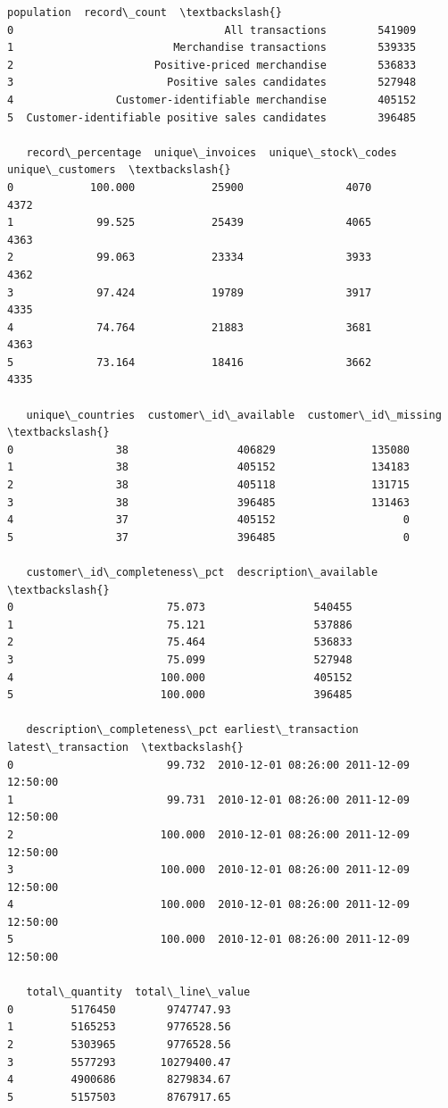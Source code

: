 \documentclass[11pt]{article}
\begin{document}
    
    \begin{Verbatim}[commandchars=\\\{\}]
                                        population  record\_count  \textbackslash{}
0                                 All transactions        541909   
1                         Merchandise transactions        539335   
2                      Positive-priced merchandise        536833   
3                        Positive sales candidates        527948   
4                Customer-identifiable merchandise        405152   
5  Customer-identifiable positive sales candidates        396485   

   record\_percentage  unique\_invoices  unique\_stock\_codes  unique\_customers  \textbackslash{}
0            100.000            25900                4070              4372   
1             99.525            25439                4065              4363   
2             99.063            23334                3933              4362   
3             97.424            19789                3917              4335   
4             74.764            21883                3681              4363   
5             73.164            18416                3662              4335   

   unique\_countries  customer\_id\_available  customer\_id\_missing  \textbackslash{}
0                38                 406829               135080   
1                38                 405152               134183   
2                38                 405118               131715   
3                38                 396485               131463   
4                37                 405152                    0   
5                37                 396485                    0   

   customer\_id\_completeness\_pct  description\_available  \textbackslash{}
0                        75.073                 540455   
1                        75.121                 537886   
2                        75.464                 536833   
3                        75.099                 527948   
4                       100.000                 405152   
5                       100.000                 396485   

   description\_completeness\_pct earliest\_transaction  latest\_transaction  \textbackslash{}
0                        99.732  2010-12-01 08:26:00 2011-12-09 12:50:00   
1                        99.731  2010-12-01 08:26:00 2011-12-09 12:50:00   
2                       100.000  2010-12-01 08:26:00 2011-12-09 12:50:00   
3                       100.000  2010-12-01 08:26:00 2011-12-09 12:50:00   
4                       100.000  2010-12-01 08:26:00 2011-12-09 12:50:00   
5                       100.000  2010-12-01 08:26:00 2011-12-09 12:50:00   

   total\_quantity  total\_line\_value  
0         5176450        9747747.93  
1         5165253        9776528.56  
2         5303965        9776528.56  
3         5577293       10279400.47  
4         4900686        8279834.67  
5         5157503        8767917.65  
    \end{Verbatim}
\end{document}
